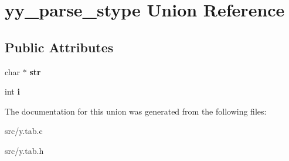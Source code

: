 \hypertarget{unionyy__parse__stype}{\section{yy\-\_\-parse\-\_\-stype Union Reference}
\label{unionyy__parse__stype}
}
\subsection*{Public Attributes}
\begin{DoxyCompactItemize}
\item 
\hypertarget{unionyy__parse__stype_ab41b871d18b9bfd3700d3fdebb3c65c6}{char $\ast$ {\bfseries str}}\label{unionyy__parse__stype_ab41b871d18b9bfd3700d3fdebb3c65c6}

\item 
\hypertarget{unionyy__parse__stype_a5024e073eb15bd6c3c21760a50e7df8e}{int {\bfseries i}}\label{unionyy__parse__stype_a5024e073eb15bd6c3c21760a50e7df8e}

\end{DoxyCompactItemize}


The documentation for this union was generated from the following files\-:\begin{DoxyCompactItemize}
\item 
src/y.\-tab.\-c\item 
src/y.\-tab.\-h\end{DoxyCompactItemize}
